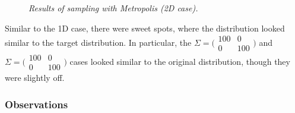 \documentclass{article} %
\begin{document}
\begin{figure}
{            \label{fig:right}%
        }\hfill%
        \hfill%
    \caption{\textit{Results of sampling with Metropolis (2D case).}}
    \label{fig:default}
\end{figure}

Similar to the 1D case, there were sweet spots, where the distribution looked similar to the target distribution. In particular, the \(\Sigma =  \bigl(\begin{smallmatrix} 100&0\\0&100 \end{smallmatrix} \bigr)\) and \(\Sigma = \bigl(\begin{smallmatrix} 100&0\\0&100 \end{smallmatrix} \bigr)\) cases looked similar to the original distribution, though they were slightly off. 

\subsubsection{Observations}
\end{document}
